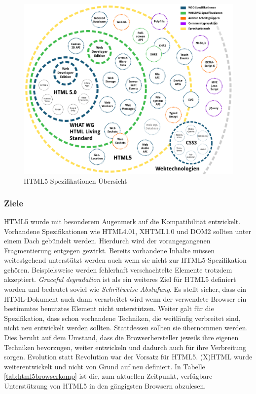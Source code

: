 \vspace{1em}
\begin{figure}[htb]
  \centering
  \includegraphics[width=0.75\linewidth]{abb/html5_specs}
  \caption[HTML5 Spezifikationen Übersicht]{HTML5 Spezifikationen Übersicht \cite{PeteKroe2014}}
  \label{fig:html5specs}
\end{figure}

\subsubsection{Ziele} HTML5 wurde mit besonderem Augenmerk auf die Kompatibilität entwickelt. Vorhandene Spezifikationen wie HTML4.01, XHTML1.0 und DOM2 sollten unter einem Dach gebündelt werden. Hierdurch wird der vorangegangenen Fragmentierung entgegen gewirkt. Bereits vorhandene Inhalte müssen weitestgehend unterstützt werden auch wenn sie nicht zur HTML5-Spezifikation gehören. Beispielsweise werden fehlerhaft verschachtelte Elemente trotzdem akzeptiert. \textit{Graceful degradation} ist als ein weiteres Ziel für HTML5 definiert worden und bedeutet soviel wie \textit{Schrittweise Abstufung}. Es stellt sicher, dass ein HTML-Dokument auch dann verarbeitet wird wenn der verwendete Browser ein bestimmtes benutztes Element nicht unterstützen. Weiter galt für die Spezifikation, dass schon vorhandene Techniken, die weitläufig verbreitet sind, nicht neu entwickelt werden sollten. Stattdessen sollten sie übernommen werden. Dies beruht auf dem Umstand, dass die Browserhersteller jeweils ihre eigenen Techniken bevorzugen, weiter entwickeln und dadurch auch für ihre Verbreitung sorgen. Evolution statt Revolution war der Vorsatz für HTML5. (X)HTML wurde weiterentwickelt und nicht von Grund auf neu definiert. In Tabelle \ref{tab:html5browserkomp} ist die, zum aktuellen Zeitpunkt, verfügbare Unterstützung von HTML5 in den gängigsten Browsern abzulesen.

